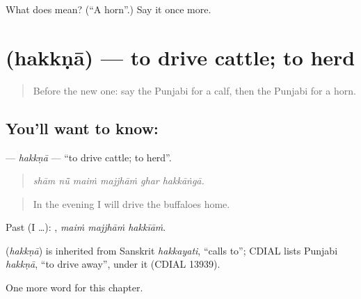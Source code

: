 \begin{tcolorbox}[breakable,colback=teal!4,colframe=teal!35!black,title={Before you move on}]
What does  mean? (\textquotedblleft{}A horn\textquotedblright{}.) Say it once more.
\end{tcolorbox}
\section[\texorpdfstring{\pa{ਹੱਕਣਾ} (hakkṇā)}{ਹੱਕਣਾ (hakkṇā)}]{ (hakkṇā) — to drive cattle; to herd}

\label{lesson:PA-C308-hakkna}



\begin{quote}
Before the new one: say the Punjabi for a calf, then the Punjabi for a horn.
\end{quote}

\subsection*{You'll want to know: }
\textbf{} — \emph{hakkṇā} — \textquotedblleft{}to drive cattle; to herd\textquotedblright{}.

\begin{quote}
     
\end{quote}

\begin{quote}
\emph{shām nū̃ maiṁ majjhāṁ ghar hakkāṅgā.}
\end{quote}

\begin{quote}
In the evening I will drive the buffaloes home.
\end{quote}

Past (I …):   , \emph{maiṁ majjhāṁ hakkīāṁ}.

\begin{cousinweb}
\textbf{} (\emph{hakkṇā}) is inherited from Sanskrit \emph{hakkayati}, \textquotedblleft{}calls to\textquotedblright{}; CDIAL lists Punjabi \emph{hakkṇā}, \textquotedblleft{}to drive away\textquotedblright{}, under it (CDIAL 13939).
\end{cousinweb}

\begin{grammarlens}[title={What you've built}]
One more word for this chapter.
\end{grammarlens}

